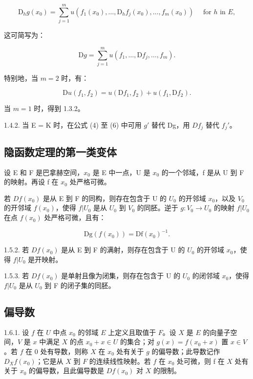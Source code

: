 \[
\mathrm{D} _ {h} g (x _ {0}) = \sum_ {j = 1} ^ {m} u (f _ {1} (x _ {0}), \dots , \mathrm{D} _ {h} f _ {j} (x _ {0}), \dots , f _ {m} (x _ {0})) \quad \text { for } h \text { in } E, \tag {4}
\]

这可简写为：

\[
\mathrm{D} g = \sum_ {j = 1} ^ {m} u (f _ {1}, \dots , \mathrm{D} f _ {j}, \dots , f _ {m}).\tag{5}
\]

特别地，当 \(m = 2\) 时，有：

\[
\mathrm{D} u (f _ {1}, f _ {2}) = u (\mathrm{D} f _ {1}, f _ {2}) + u (f _ {1}, \mathrm{D} f _ {2}).\tag{6}
\]

当 \(m = 1\) 时，得到 1.3.2。

1.4.2. 当 E = K 时，在公式 (4) 至 (6) 中可用 \(g'\) 替代 Dg，用 \(Df_{j}\) 替代 \(f_{j}'\)。

\subsection{隐函数定理的第一类变体}

设 E 和 F 是巴拿赫空间，\(x_{0}\) 是 E 中一点，U 是 \(x_{0}\) 的一个邻域，f 是从 U 到 F 的映射。再设 f 在 \(x_{0}\) 处严格可微。

若 \(Df(x_0)\) 是从 E 到 F 的同构，则存在包含于 U 的 \(U_0\) 的开邻域 \(x_0\)，以及 \(V_0\) 的开邻域 \(f(x_0)\)，使得 \(f|U_0\) 是从 \(U_0\) 到 \(V_0\) 的同胚。逆于 \(g: V_0 \to U_0\) 的映射 \(f|U_0\) 在点 \(f(x_0)\) 处严格可微，且有：

\[
\mathrm{Dg} (f (x _ {0})) = \mathrm{Df} (x _ {0}) ^ {- 1}.
\]

1.5.2. 若 \(Df(x_{0})\) 是从 E 到 F 的满射，则存在包含于 U 的 \(U_{0}\) 的开邻域 \(x_{0}\)，使得 \(f|U_{0}\) 是开映射。

1.5.3. 若 \(Df(x_{0})\) 是单射且像为闭集，则存在包含于 U 的 \(U_{0}\) 的闭邻域 \(x_{0}\)，使得 \(f|U_{0}\) 是从 \(U_{0}\) 到 F 的闭子集的同胚。

\subsection{偏导数}

1.6.1. 设 \(f\) 在 \(U\) 中点 \(x_0\) 的邻域 \(E\) 上定义且取值于 \(F\)。设 \(X\) 是 \(E\) 的向量子空间，\(V\) 是 \(x\) 中满足 \(X\) 的点 \(x_0 + x \in U\) 的集合；对 \(g(x) = f(x_0 + x)\) 置 \(x \in V\)。若 \(f\) 在 0 处有导数，则称 \(X\) 在 \(x_0\) 处有关于 \(g\) 的偏导数；此导数记作 \(D_X f(x_0)\)；它是从 \(X\) 到 \(F\) 的连续线性映射。若 \(f\) 在 \(x_0\) 处可微，则 f 在 \(X\) 处有关于 \(x_0\) 的偏导数，且此偏导数是 \(Df(x_0)\) 对 \(X\) 的限制。

